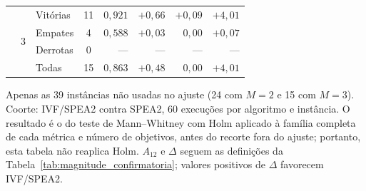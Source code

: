 \begin{table}[!htb]
\begin{tabular*}{\textwidth}{@{\extracolsep{\fill}}lllcrrrr@{}}
         & \multirow{4}{*}{3} & Vitórias & 11 & $0{,}921$ & $+0{,}66$ & $+0{,}09$ & $+4{,}01$ \\
         &  & Empates & 4 & $0{,}588$ & $+0{,}03$ & $0{,}00$ & $+0{,}07$ \\
         &  & Derrotas & 0 & --- & --- & --- & --- \\
         &  & Todas & 15 & $0{,}863$ & $+0{,}48$ & $0{,}00$ & $+4{,}01$ \\
        \bottomrule
    \end{tabular*}
    \par\smallskip
    \parbox{\textwidth}{\footnotesize
    Apenas as 39 instâncias não usadas no ajuste (24 com $M=2$ e 15 com $M=3$). Coorte: IVF/SPEA2 contra SPEA2, 60 execuções por algoritmo e instância. O resultado é o do teste de Mann--Whitney com Holm aplicado à família completa de cada métrica e número de objetivos, antes do recorte fora do ajuste; portanto, esta tabela não reaplica Holm. $A_{12}$ e $\Delta$ seguem as definições da Tabela~\ref{tab:magnitude_confirmatoria}; valores positivos de $\Delta$ favorecem IVF/SPEA2.
    }
\end{table}
